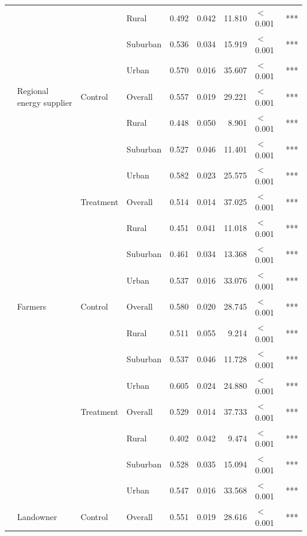 \begin{longtable}[t]{>{\raggedright\arraybackslash}t{4cm}>{\raggedright\arraybackslash}t{4cm}>{\raggedright\arraybackslash}t{2.5cm}lrrrll}
\nopagebreak
 &  &  & Rural & 0.492 & 0.042 & 11.810 & $<$0.001 & ***\\
\nopagebreak
 &  &  & Suburban & 0.536 & 0.034 & 15.919 & $<$0.001 & ***\\
\nopagebreak
 &  &  & Urban & 0.570 & 0.016 & 35.607 & $<$0.001 & ***\\
\nopagebreak
 & Regional energy supplier & Control & Overall & 0.557 & 0.019 & 29.221 & $<$0.001 & ***\\
\nopagebreak
 &  &  & Rural & 0.448 & 0.050 & 8.901 & $<$0.001 & ***\\
\nopagebreak
 &  &  & Suburban & 0.527 & 0.046 & 11.401 & $<$0.001 & ***\\
\nopagebreak
 &  &  & Urban & 0.582 & 0.023 & 25.575 & $<$0.001 & ***\\
\nopagebreak
 &  & Treatment & Overall & 0.514 & 0.014 & 37.025 & $<$0.001 & ***\\
\nopagebreak
 &  &  & Rural & 0.451 & 0.041 & 11.018 & $<$0.001 & ***\\
\nopagebreak
 &  &  & Suburban & 0.461 & 0.034 & 13.368 & $<$0.001 & ***\\
\nopagebreak
 &  &  & Urban & 0.537 & 0.016 & 33.076 & $<$0.001 & ***\\
\nopagebreak
 & Farmers & Control & Overall & 0.580 & 0.020 & 28.745 & $<$0.001 & ***\\
\nopagebreak
 &  &  & Rural & 0.511 & 0.055 & 9.214 & $<$0.001 & ***\\
\nopagebreak
 &  &  & Suburban & 0.537 & 0.046 & 11.728 & $<$0.001 & ***\\
\nopagebreak
 &  &  & Urban & 0.605 & 0.024 & 24.880 & $<$0.001 & ***\\
\nopagebreak
 &  & Treatment & Overall & 0.529 & 0.014 & 37.733 & $<$0.001 & ***\\
\nopagebreak
 &  &  & Rural & 0.402 & 0.042 & 9.474 & $<$0.001 & ***\\
\nopagebreak
 &  &  & Suburban & 0.528 & 0.035 & 15.094 & $<$0.001 & ***\\
\nopagebreak
 &  &  & Urban & 0.547 & 0.016 & 33.568 & $<$0.001 & ***\\
\nopagebreak
 & Landowner & Control & Overall & 0.551 & 0.019 & 28.616 & $<$0.001 & ***\\

\end{longtable}
